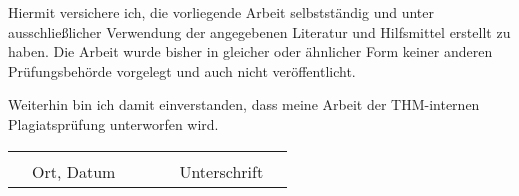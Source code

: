 Hiermit versichere ich, die vorliegende Arbeit selbstständig und unter ausschließlicher Verwendung der angegebenen Literatur und Hilfsmittel erstellt zu haben. Die Arbeit wurde bisher in gleicher oder ähnlicher Form keiner anderen Prüfungsbehörde vorgelegt und auch nicht veröffentlicht.

Weiterhin bin ich damit einverstanden, dass meine Arbeit der THM-internen Plagiatsprüfung unterworfen wird.
\begin{table}[ht]
   \centering 
    \begin{tabular}{cc cp{4cm}c cc}
    &&&&&&\\\cline{1-3}\cline{5-7}
    &Ort, Datum &&&& Unterschrift&\\
    \end{tabular}
\end{table}
